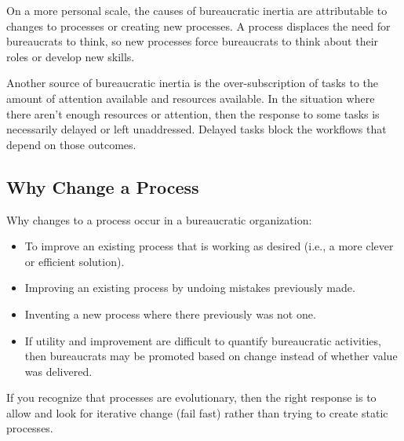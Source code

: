 On a more personal scale, the causes of bureaucratic inertia are attributable to changes to processes or creating new processes. A process displaces the need for bureaucrats to think, so new processes force bureaucrats to think about their roles or develop new skills. 



Another source of bureaucratic inertia is the over-subscription of tasks to the amount of attention available and resources available. In the situation where there aren't enough resources or attention, then the response to some tasks is necessarily delayed or left unaddressed. Delayed tasks block the workflows that depend on those outcomes. 





\subsection*{Why Change a Process}
Why changes to a process occur in a bureaucratic organization:
\begin{itemize}
    \item To improve an existing process that is working as desired (i.e., a more clever or efficient solution).
    \item Improving an existing process by undoing mistakes previously made.
    \item Inventing a new process where there previously was not one.
    \item If utility and improvement are difficult to quantify bureaucratic activities, then bureaucrats may be promoted based on change instead of whether value was delivered.
\end{itemize}

If you recognize that processes are evolutionary, then the right response is to allow and look for iterative change (fail fast) rather than trying to create static processes.

